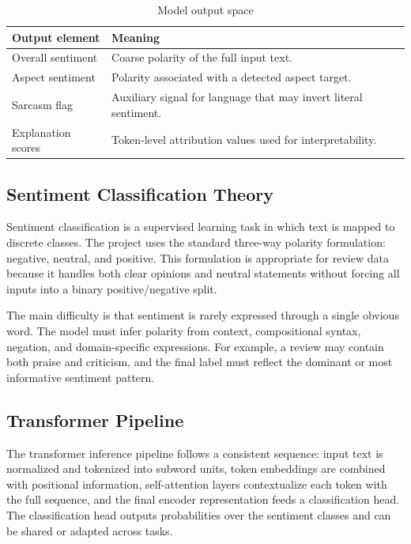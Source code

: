 \documentclass[12pt, a4paper]{article}
\begin{document}
\begin{table}[H]
\centering
\caption{Model output space}
\begin{tabularx}{\textwidth}{@{} p{3.2cm} X @{}}
\toprule
\textbf{Output element} & \textbf{Meaning} \\
\midrule
Overall sentiment & Coarse polarity of the full input text. \\
Aspect sentiment & Polarity associated with a detected aspect target. \\
Sarcasm flag & Auxiliary signal for language that may invert literal sentiment. \\
Explanation scores & Token-level attribution values used for interpretability. \\
\bottomrule
\end{tabularx}
\end{table}

\subsection{Sentiment Classification Theory}
Sentiment classification is a supervised learning task in which text is mapped to discrete classes. The project uses the standard three-way polarity formulation: negative, neutral, and positive. This formulation is appropriate for review data because it handles both clear opinions and neutral statements without forcing all inputs into a binary positive/negative split.

The main difficulty is that sentiment is rarely expressed through a single obvious word. The model must infer polarity from context, compositional syntax, negation, and domain-specific expressions. For example, a review may contain both praise and criticism, and the final label must reflect the dominant or most informative sentiment pattern.

\subsection{Transformer Pipeline}
The transformer inference pipeline follows a consistent sequence: input text is normalized and tokenized into subword units, token embeddings are combined with positional information, self-attention layers contextualize each token with the full sequence, and the final encoder representation feeds a classification head. The classification head outputs probabilities over the sentiment classes and can be shared or adapted across tasks.
\end{document}
